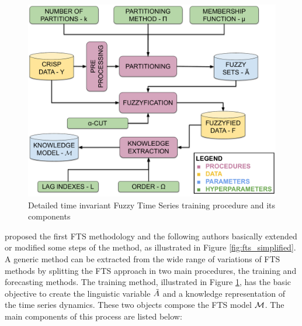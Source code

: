 \begin{figure}[htb]
    \centering
    \includegraphics[width=\textwidth]{figures/fts_training.pdf}
    \caption{Detailed time invariant Fuzzy Time Series training procedure and its components}
    \label{fig:fts_training}
\end{figure}

\cite{Song1993partI} proposed the first FTS methodology and the following authors basically extended or modified some steps of the method, as illustrated in Figure \ref{fig:fts_simplified}. A generic method can be extracted from the wide range of variations of FTS methods by splitting the FTS approach in two main procedures, the training and forecasting methods. The training method, illustrated in Figure \ref{fig:fts_training}, has the basic objective to create the linguistic variable $\tilde{A}$ and a knowledge representation of the time series dynamics. These two objects compose the FTS model $\mathcal{M}$. The main components of this process are listed below:

